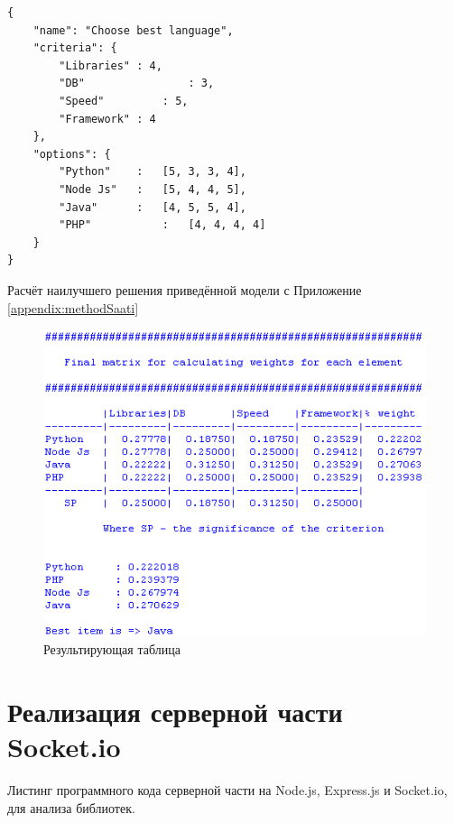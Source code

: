 \begin{lstlisting}
{
	"name": "Choose best language",
	"criteria": { 
		"Libraries"	: 4,
		"DB"				: 3,
		"Speed"			: 5,
		"Framework"	: 4
	},
	"options": {
		"Python"	:   [5, 3, 3, 4],
		"Node Js"	:   [5, 4, 4, 5],
		"Java"		:   [4, 5, 5, 4],
		"PHP"			:   [4, 4, 4, 4]
	} 
}
\end{lstlisting}

Расчёт наилучшего решения приведённой модели с Приложение \ref{appendix:methodSaati}

\begin{figure}
	\centering
	\includegraphics[width=1\linewidth]{my_folder/images/BestSolution1}
	\caption{Результирующая таблица}
	\label{fig:BestSolution1}
\end{figure}

\chapter{Реализация серверной части Socket.io}
\label{appendix:serverSideBySocketIO}

Листинг программного кода серверной части на Node.js, Express.js и Socket.io, для анализа библиотек.


